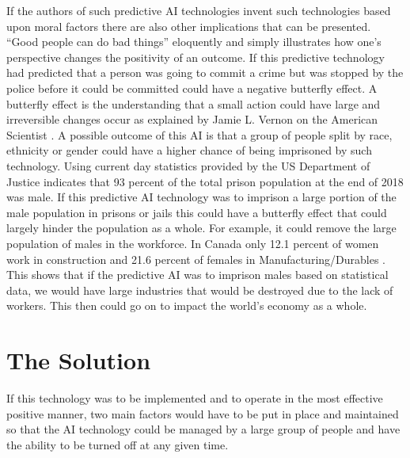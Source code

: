 \documentclass{article}
\begin{document}
If the authors of such predictive AI technologies invent such technologies based upon moral factors there are also other implications that can be presented. “Good people can do bad things'' \cite{ellemers_toorn_paunov} eloquently and simply illustrates how one's perspective changes the positivity of an outcome. If this predictive technology had predicted that a person was going to commit a crime but was stopped by the police before it could be committed could have a negative butterfly effect. A butterfly effect is the understanding that a small action could have large and irreversible changes occur as explained by Jamie L. Vernon on the American Scientist \cite{vernon_2017}. A possible outcome of this AI is that a group of people split by race, ethnicity or gender could have a higher chance of being imprisoned by such technology. Using current day statistics provided by the US Department of Justice \cite{carson_2020} indicates that 93 percent of the total prison population at the end of 2018 was male. If this predictive AI technology was to imprison a large portion of the male population in prisons or jails this could have a butterfly effect that could largely hinder the population as a whole. For example, it could remove the large population of males in the workforce. In Canada only 12.1 percent of women work in construction and 21.6 percent of females in Manufacturing/Durables \cite{catalyst_2020}. This shows that if the predictive AI was to imprison males based on statistical data, we would have large industries that would be destroyed due to the lack of workers. This then could go on to impact the world's economy as a whole.

\section{The Solution}

If this technology was to be implemented and to operate in the most effective positive manner, two main factors would have to be put in place and maintained so that the AI technology could be managed by a large group of people and have the ability to be turned off at any given time.
\end{document}
